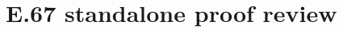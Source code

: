 \documentclass[11pt,a4paper]{article}
\begin{document}
\section*{E.67 standalone proof review}



\end{document}
